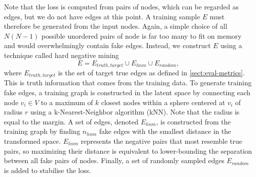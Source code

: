 Note that the loss is computed from pairs of nodes, which can be regarded as edges, but we do not have edges at this point. 
A training sample $E$ must therefore be generated from the input nodes. 
Again, a simple choice of all $N(N-1)$ possible unordered pairs of node is far too many to fit on memory and would overwhelmingly contain fake edges. 
Instead, we construct $E$ using a technique called hard negative mining \cite{robinson2021contrastivelearninghardnegative}
\begin{equation}
    \label{eq:9.7}
    {E} = E_{truth, target} \cup E_{hnm} \cup E_{random},
\end{equation}
where $E_{truth, target}$ is the set of target true edges as defined in \ref{sect:eval-metrics}. 
This is truth information that comes from the training data. 
To generate training fake edges, a training graph is constructed in the latent space by connecting each node $v_i \in V$ to a maximum of $k$ closest nodes within a sphere centered at $v_i$ of radius $r$ using a k-Nearest-Neighbor algorithm (kNN). 
Note that the radius is equal to the margin. 
A set of edges, denoted $E_{hnm}$, is constructed from the training graph by finding $n_{hnm}$ fake edges with the smallest distance in the transformed space.
$E_{hnm}$ represents the negative pairs that most resemble true pairs, so maximizing their distance is equivalent to lower-bounding the separation between all fake pairs of nodes. 
Finally, a set of randomly sampled edges $E_{random}$ is added to stabilise the loss. %

